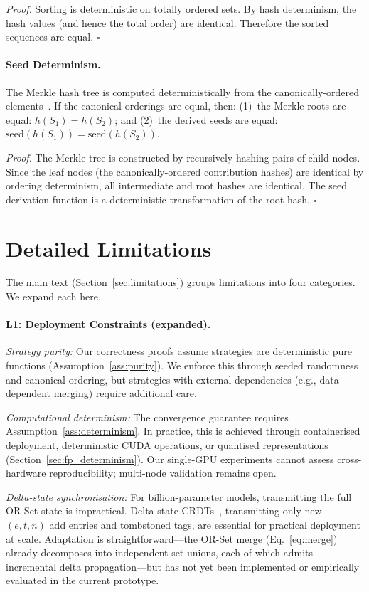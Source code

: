 \documentclass[10pt,letterpaper]{article}
\begin{document}
\emph{Proof.}
Sorting is deterministic on totally ordered sets.
By hash determinism, the hash values (and hence the total order) are identical.
Therefore the sorted sequences are equal. $\square$

\paragraph{Seed Determinism.}
The Merkle hash tree is computed deterministically from the canonically-ordered elements~\cite{sanjuan2020merkle}.
If the canonical orderings are equal, then: (1)~the Merkle roots are equal: $h(S_1) = h(S_2)$; and (2)~the derived seeds are equal: $\mathrm{seed}(h(S_1)) = \mathrm{seed}(h(S_2))$.

\emph{Proof.}
The Merkle tree is constructed by recursively hashing pairs of child nodes.
Since the leaf nodes (the canonically-ordered contribution hashes) are identical by ordering determinism, all intermediate and root hashes are identical.
The seed derivation function is a deterministic transformation of the root hash. $\square$

\section{Detailed Limitations}\label{app:limitations}

The main text (Section~\ref{sec:limitations}) groups limitations into four categories.  We expand each here.

\paragraph{L1: Deployment Constraints (expanded).}
\emph{Strategy purity:} Our correctness proofs assume strategies are deterministic pure functions (Assumption~\ref{ass:purity}).
We enforce this through seeded randomness and canonical ordering, but strategies with external dependencies (e.g., data-dependent merging) require additional care.

\emph{Computational determinism:} The convergence guarantee requires Assumption~\ref{ass:determinism}.
In practice, this is achieved through containerised deployment, deterministic CUDA operations, or quantised representations (Section~\ref{sec:fp_determinism}).
Our single-GPU experiments cannot assess cross-hardware reproducibility; multi-node validation remains open.

\emph{Delta-state synchronisation:} For billion-parameter models, transmitting the full OR-Set state is impractical.
Delta-state CRDTs~\cite{almeida2018delta}, transmitting only new $(e,t,n)$ add entries and tombstoned tags, are essential for practical deployment at scale.
Adaptation is straightforward---the OR-Set merge (Eq.~\ref{eq:merge}) already decomposes into independent set unions, each of which admits incremental delta propagation---but has not yet been implemented or empirically evaluated in the current prototype.
\end{document}
